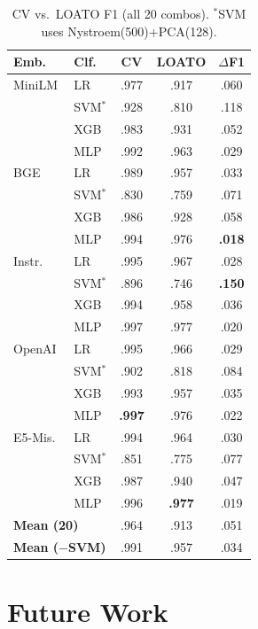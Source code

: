 \documentclass[conference]{IEEEtran}
\newcommand{\df}{$\Delta$F1}
\newcommand{\Fone}{F1}
\begin{document}
\begin{table}[h]
\centering
\setlength{\tabcolsep}{3pt}
\footnotesize
\caption{CV vs.\ LOATO \Fone{} (all 20 combos). $^*$SVM uses
  Nystroem(500)+PCA(128).}
\label{tab:full-results}
\begin{tabular}{llccc}
\toprule
\textbf{Emb.} & \textbf{Clf.} & \textbf{CV} & \textbf{LOATO} & \textbf{\df{}} \\
\midrule
MiniLM & LR & .977 & .917 & .060 \\
        & SVM$^*$ & .928 & .810 & .118 \\
        & XGB & .983 & .931 & .052 \\
        & MLP & .992 & .963 & .029 \\
\midrule
BGE & LR & .989 & .957 & .033 \\
    & SVM$^*$ & .830 & .759 & .071 \\
    & XGB & .986 & .928 & .058 \\
    & MLP & .994 & .976 & \textbf{.018} \\
\midrule
Instr.\ & LR & .995 & .967 & .028 \\
         & SVM$^*$ & .896 & .746 & \textbf{.150} \\
         & XGB & .994 & .958 & .036 \\
         & MLP & .997 & .977 & .020 \\
\midrule
OpenAI & LR & .995 & .966 & .029 \\
       & SVM$^*$ & .902 & .818 & .084 \\
       & XGB & .993 & .957 & .035 \\
       & MLP & \textbf{.997} & .976 & .022 \\
\midrule
E5-Mis.\ & LR & .994 & .964 & .030 \\
          & SVM$^*$ & .851 & .775 & .077 \\
          & XGB & .987 & .940 & .047 \\
          & MLP & .996 & \textbf{.977} & .019 \\
\midrule
\multicolumn{2}{l}{\textbf{Mean (20)}} & .964 & .913 & .051 \\
\multicolumn{2}{l}{\textbf{Mean ($-$SVM)}} & .991 & .957 & .034 \\
\bottomrule
\end{tabular}
\end{table}

\section{Future Work}
\label{app:future}
\end{document}

